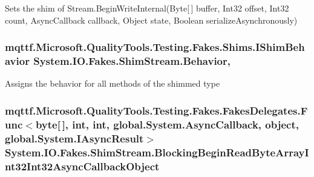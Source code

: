 Sets the shim of Stream.\-Begin\-Write\-Internal(\-Byte\mbox{[}$\,$\mbox{]} buffer, Int32 offset, Int32 count, Async\-Callback callback, Object state, Boolean serialize\-Asynchronously)

\hypertarget{class_system_1_1_i_o_1_1_fakes_1_1_shim_stream_abaf9121708c28b2b75a3d246acc6071d}{
\subsubsection[{Behavior}]{\setlength{\rightskip}{0pt plus 5cm}mqttf.\-Microsoft.\-Quality\-Tools.\-Testing.\-Fakes.\-Shims.\-I\-Shim\-Behavior System.\-I\-O.\-Fakes.\-Shim\-Stream.\-Behavior\hspace{0.3cm}{\ttfamily [static]}, {\ttfamily [set]}}}\label{class_system_1_1_i_o_1_1_fakes_1_1_shim_stream_abaf9121708c28b2b75a3d246acc6071d}


Assigns the behavior for all methods of the shimmed type

\hypertarget{class_system_1_1_i_o_1_1_fakes_1_1_shim_stream_af306d6ec26adfa2af54ceb3322f64240}{
\subsubsection[{Blocking\-Begin\-Read\-Byte\-Array\-Int32\-Int32\-Async\-Callback\-Object}]{\setlength{\rightskip}{0pt plus 5cm}mqttf.\-Microsoft.\-Quality\-Tools.\-Testing.\-Fakes.\-Fakes\-Delegates.\-Func$<$byte\mbox{[}$\,$\mbox{]}, int, int, global.\-System.\-Async\-Callback, object, global.\-System.\-I\-Async\-Result$>$ System.\-I\-O.\-Fakes.\-Shim\-Stream.\-Blocking\-Begin\-Read\-Byte\-Array\-Int32\-Int32\-Async\-Callback\-Object\hspace{0.3cm}{\ttfamily [set]}}}\label{class_system_1_1_i_o_1_1_fakes_1_1_shim_stream_af306d6ec26adfa2af54ceb3322f64240}


